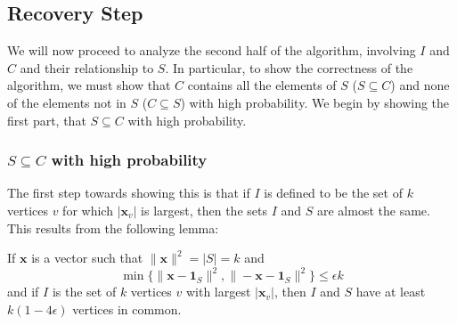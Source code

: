 \documentclass{article}
\begin{document}
\subsection{Recovery Step}
We will now proceed to analyze the second half of the algorithm, involving $I$
and $C$ and their relationship to $S$. In particular, to show the correctness
of the algorithm, we must show that $C$ contains all the elements of $S$ ($S
\subseteq C$) and none of the elements not in $S$ ($C \subseteq S$) with high
probability. We begin by showing the first part, that $S \subseteq C$ with high probability.

\subsubsection{$S \subseteq C$ with high probability}
The first step towards showing this is that if $I$ is defined to be the set of
$k$ vertices $v$ for which $|\mathbf{x}_{v}|$ is largest, then the sets $I$ and $S$ are almost
the same. This results from the following lemma:
\begin{lemma}
    If $\mathbf{x}$ is a vector such that $\|\mathbf{x}\|^{2} = |S| = k$ and
    $$\min\{\|\mathbf{x} - \mathbf{1}_{S}\|^{2}, \|-\mathbf{x} - \mathbf{1}_{S}\|^{2}\} \leq
    \epsilon k$$
    and if $I$ is the set of $k$ vertices $v$ with largest $|\mathbf{x}_{v}|$, then $I$
    and $S$ have at least $k(1 - 4 \epsilon)$ vertices in common.
\end{lemma}
\end{document}
